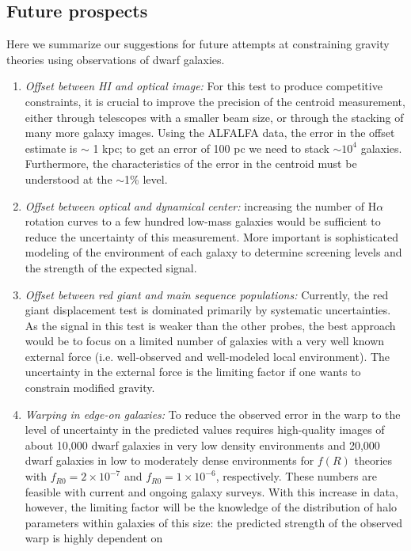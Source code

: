 \documentclass[useAMS,usenatbib,twocolumn]{mn2e}
\newcommand{\ha}{H$\alpha$}
\begin{document}
\subsection{Future prospects}
Here we summarize our suggestions for future attempts at constraining
gravity theories using observations of dwarf galaxies.
\begin{enumerate}
\item {\it Offset between HI and optical image:}
  For this test to produce competitive constraints, it is crucial to improve
  the precision of the centroid measurement, either through telescopes with
  a smaller beam size, or through the stacking of many more galaxy images.
  Using the ALFALFA data, the error in the offset estimate is $\sim$ 1 kpc;
  to get an error of 100 pc we need to stack $\sim 10^{4}$
  galaxies.  Furthermore, the characteristics of the error
  in the centroid must be understood at the $\sim$1\% level.
\item {\it Offset between optical and dynamical center:}
  increasing the number of \ha~ rotation curves to a few hundred 
  low-mass galaxies would be sufficient to reduce the uncertainty of
  this measurement.  More important is sophisticated
  modeling of the environment of each galaxy to determine screening levels and
  the strength of the expected signal.
\item {\it Offset between red giant and main sequence populations:}
  Currently, the red giant displacement test is dominated primarily by
  systematic uncertainties. As the signal in this test is weaker than the
  other probes, the best approach would be to focus on a limited number
  of galaxies with a very well known external force (i.e. well-observed and
  well-modeled local environment). The uncertainty in the external force is the
  limiting factor if one wants to constrain modified gravity.
\item {\it Warping in edge-on galaxies:}
  To reduce the observed error in the warp to the level of uncertainty in the 
  predicted values requires high-quality images
  of about 10,000 dwarf galaxies in very low density environments and 20,000
  dwarf galaxies in low to moderately dense environments for $f(R)$ theories
  with $f_{R0} = 2\times10^{-7}$ and $f_{R0} = 1\times10^{-6}$, respectively.
  These numbers are feasible with  current and ongoing galaxy surveys.
  With this increase in data, however, the limiting factor will be the
  knowledge of the distribution of halo parameters within galaxies of this
  size: the predicted strength of the observed warp is highly dependent on

\end{enumerate}
\end{document}
